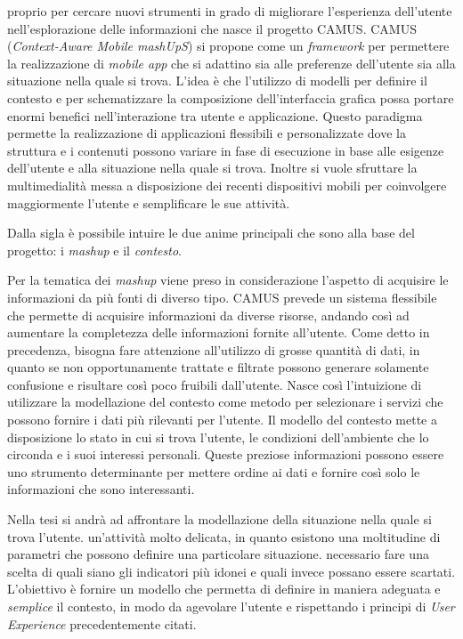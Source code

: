 \upe proprio per cercare nuovi strumenti in grado di migliorare l'esperienza dell'u\-ten\-te nell'esplorazione delle informazioni che nasce il progetto CAMUS. CAMUS (\emph{Context-Aware Mobile mashUpS}) si propone come un \emph{framework} per permettere la realizzazione di \emph{mobile app} che si adattino sia alle preferenze dell'utente sia alla situazione nella quale si trova. L'idea è che l'utilizzo di modelli per definire il contesto e per schematizzare la composizione dell'interfaccia grafica possa portare enormi benefici nell'interazione tra utente e applicazione.
Questo paradigma permette la realizzazione di applicazioni flessibili e personalizzate dove la struttura e i contenuti possono variare in fase di esecuzione in base alle esigenze dell'utente e alla situazione nella quale si trova. Inoltre si vuole sfruttare la multimedialità messa a disposizione dei recenti dispositivi mobili per coinvolgere maggiormente l'utente e semplificare le sue attività.

Dalla sigla è possibile intuire le due anime principali che sono alla base del progetto: i \emph{mashup} e il \emph{contesto}.

Per la tematica dei \emph{mashup} viene preso in considerazione l'aspetto di acquisire le informazioni da più fonti di diverso tipo. CAMUS prevede un sistema flessibile che permette di acquisire informazioni da diverse risorse, andando così ad aumentare la completezza delle informazioni fornite all'utente. Come detto in precedenza, bisogna fare attenzione all'utilizzo di grosse quantità di dati, in quanto se non opportunamente trattate e filtrate possono generare solamente confusione e risultare così poco fruibili dall'utente. Nasce così l'intuizione di utilizzare la modellazione del contesto come metodo per selezionare i servizi che possono fornire i dati più rilevanti per l'utente. Il modello del contesto mette a disposizione lo stato in cui si trova l'utente, le condizioni dell'ambiente che lo circonda e i suoi interessi personali. Queste preziose informazioni possono essere uno strumento determinante per mettere ordine ai dati e fornire così solo le informazioni che sono interessanti.

Nella tesi si andrà ad affrontare la modellazione della situazione nella quale si trova l'utente. \upe un'attività molto delicata, in quanto esistono una moltitudine di parametri che possono definire una particolare situazione. \upe necessario fare una scelta di quali siano gli indicatori più idonei e quali invece possano essere scartati. L'obiettivo è fornire un modello che permetta di definire in maniera adeguata e \emph{semplice} il contesto, in modo da agevolare l'utente e rispettando i principi di \emph{User Experience} precedentemente citati.

